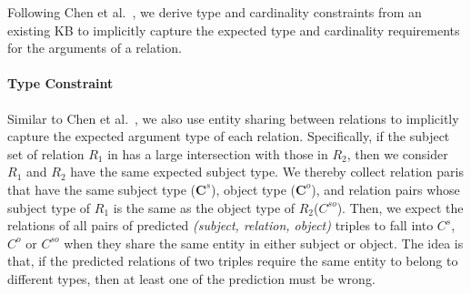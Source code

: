 

Following Chen et al.~, we derive type and cardinality constraints from an existing KB to implicitly capture the expected type and cardinality requirements for the arguments of a relation. 
\paragraph{Type Constraint}
Similar to Chen et al.~, we also use entity sharing between relations to implicitly capture the expected argument type of each relation.
Specifically, if the subject set of relation $R_1$ in \KB has a large intersection with those in $R_2$, then we consider $R_1$ and $R_2$ have the same expected subject type. 
We thereby collect relation paris that have the same subject type ($\textbf{C}^s$), object type ($\textbf{C}^o$), and relation pairs whose subject type of $R_1$ is the same as the object type of $R_2$($C^{so}$).
Then, we expect the relations of all pairs of predicted \emph{(subject, relation, object)} triples to fall into $C^s$, $C^o$ or $C^{so}$ when they share the same entity in either subject or object.
The idea is that, if the predicted relations of two triples require the same entity to belong to different types, then at least one of the prediction must be wrong.

